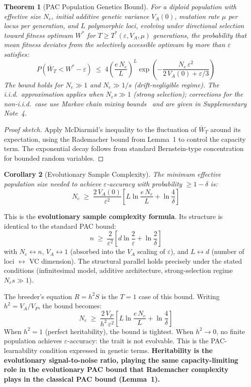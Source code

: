 \documentclass[12pt]{article}
\newtheorem{theorem}{Theorem}
\newtheorem{corollary}[theorem]{Corollary}
\theoremstyle{remark}
\begin{document}
\begin{theorem}[PAC Population Genetics Bound]
\label{thm:pac}
For a diploid population with effective size $N_e$, initial additive genetic variance $V_A(0)$, mutation rate $\mu$ per locus per generation, and $L$ polymorphic loci, evolving under directional selection toward fitness optimum $W^*$ for $T \geq T^*(\varepsilon, V_A, \mu)$ generations, the probability that mean fitness deviates from the selectively accessible optimum by more than $\varepsilon$ satisfies:
\[
  P\!\left(\bar{W}_T < W^* - \varepsilon\right) \;\leq\; 4\left(\frac{e\,N_e}{L}\right)^{\!L}
  \exp\!\left(-\frac{N_e\,\varepsilon^2}{2\,V_A(0) + \varepsilon/3}\right)
\]
The bound holds for $N_e \gg 1$ and $N_e \gg 1/s$ (drift-negligible regime). The i.i.d.\ approximation applies when $N_e s \gg 1$ (strong selection); corrections for the non-i.i.d.\ case use Markov chain mixing bounds~\cite{yu1994} and are given in Supplementary Note~4.
\end{theorem}

\begin{proof}[Proof sketch]
Apply McDiarmid's inequality to the fluctuation of $\bar{W}_T$ around its expectation, using the Rademacher bound from Lemma~1 to control the capacity term. The exponential decay follows from standard Bernstein-type concentration for bounded random variables.
\end{proof}

\begin{corollary}[Evolutionary Sample Complexity]
The minimum effective population size needed to achieve $\varepsilon$-accuracy with probability $\geq 1 - \delta$ is:
\[
  N_e \;\geq\; \frac{2\,V_A(0)}{\varepsilon^2}\left[L\ln\frac{e\,N_e}{L} + \ln\frac{4}{\delta}\right]
\]
\end{corollary}

This is the \textbf{evolutionary sample complexity formula}. Its structure is identical to the standard PAC bound:
\[
  n \;\geq\; \frac{2}{\varepsilon^2}\left[d\ln\frac{2}{\varepsilon} + \ln\frac{2}{\delta}\right]
\]
with $N_e \leftrightarrow n$, $V_A \leftrightarrow 1$ (absorbed into the $V_A$ scaling of $\varepsilon$), and $L \leftrightarrow d$ (number of loci $\leftrightarrow$ VC dimension). The structural parallel holds precisely under the stated conditions (infinitesimal model, additive architecture, strong-selection regime $N_e s \gg 1$).

The breeder's equation $R = h^2 S$ is the $T = 1$ case of this bound. Writing $h^2 = V_A/V_P$, the bound becomes:
\[
  N_e \;\geq\; \frac{2\,V_P}{h^2\,\varepsilon^2}\left[L\ln\frac{e\,N_e}{L} + \ln\frac{4}{\delta}\right]
\]
When $h^2 = 1$ (perfect heritability), the bound is tightest. When $h^2 \to 0$, no finite population achieves $\varepsilon$-accuracy: the trait is not evolvable. This is the PAC-learnability condition expressed in genetic terms. \textbf{Heritability is the evolutionary signal-to-noise ratio, playing the same capacity-limiting role in the evolutionary PAC bound that Rademacher complexity plays in the classical PAC bound (Lemma~1).}
\end{document}
